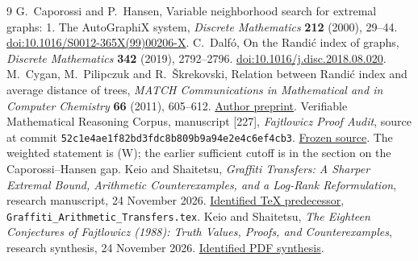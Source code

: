 \documentclass[11pt,a4paper]{article}
\theoremstyle{remark}\newtheorem{remark}[theorem]{Remark}
\newcommand{\doi}[1]{\href{https://doi.org/#1}{doi:#1}}
\begin{document}
\begin{thebibliography}{9}
G.~Caporossi and P.~Hansen,
Variable neighborhood search for extremal graphs: 1. The AutoGraphiX system,
\emph{Discrete Mathematics} \textbf{212} (2000), 29--44.
\doi{10.1016/S0012-365X(99)00206-X}.
C.~Dalf\'o, On the Randi\'c index of graphs,
\emph{Discrete Mathematics} \textbf{342} (2019), 2792--2796.
\doi{10.1016/j.disc.2018.08.020}.
M.~Cygan, M.~Pilipczuk and R.~\v Skrekovski,
Relation between Randi\'c index and average distance of trees,
\emph{MATCH Communications in Mathematical and in Computer Chemistry}
\textbf{66} (2011), 605--612.
\href{https://users.fmf.uni-lj.si/skreko/Old/MyPapers/01130.pdf}{Author preprint}.
Verifiable Mathematical Reasoning Corpus, manuscript [227],
\emph{Fajtlowicz Proof Audit}, source at commit
\texttt{52c1e4ae1f82bd3fdc8b809b9a94e2e4c6ef4cb3}.
\href{https://github.com/QEEDDD/Verifiable-Mathematical-Reasoning-Corpus/blob/52c1e4ae1f82bd3fdc8b809b9a94e2e4c6ef4cb3/%5B227%5D%20Fajtlowicz_Proof_Audit.tex}{Frozen source}.
The weighted statement is (W); the earlier sufficient cutoff is in the
section on the Caporossi--Hansen gap.
Keio and Shaitetsu, \emph{Graffiti Transfers: A Sharper Extremal Bound,
Arithmetic Counterexamples, and a Log-Rank Reformulation},
research manuscript, 24 November 2026.
\href{https://chatgpt.com/library?file_id=libfile_fde3_f-1194bbf4fa3c819195f961b370223ba2_67c74a3277a88191acd4edb2733e13fb&account_id=personal}{Identified TeX predecessor},
\texttt{Graffiti\_Arithmetic\_Transfers.tex}.
Keio and Shaitetsu, \emph{The Eighteen Conjectures of Fajtlowicz (1988):
Truth Values, Proofs, and Counterexamples}, research synthesis,
24 November 2026.
\href{https://chatgpt.com/library?file_id=libfile_fde3_f-d8451b980f7c8191958608b0992ffc0e_67c74a3277a88191acd4edb2733e13fb&account_id=personal}{Identified PDF synthesis}.
\end{thebibliography}
\end{document}
